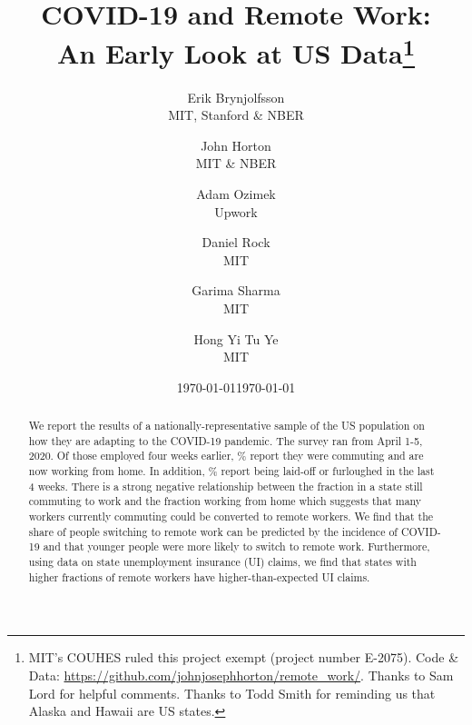 \documentclass[12pt]{article}
\newcommand{\covid}{COVID-19}
\begin{document}
 



\title{COVID-19 and Remote Work:\\ An Early Look at US Data\footnote{
    MIT's COUHES ruled this project exempt (project number E-2075).
    {Code \& Data: \href{https://github.com/johnjosephhorton/remote\_work/}{https://github.com/johnjosephhorton/remote\_work/}}.
    Thanks to Sam Lord for helpful comments.
    Thanks to Todd Smith for reminding us that Alaska and Hawaii are US states. 
  }}

\date{\today}

\date{\today}

\author{Erik Brynjolfsson\\MIT, Stanford \& NBER \and John Horton\\MIT \& NBER \and Adam Ozimek\\Upwork \and Daniel Rock\\MIT \and Garima Sharma\\MIT \and Hong Yi Tu Ye\\MIT}


\maketitle

\begin{abstract}
  \noindent 
  We report the results of a nationally-representative sample of the US population on how they are adapting to the \covid{} pandemic.
  The survey ran from April 1-5, 2020.
  Of those employed four weeks earlier, \WFH{}\% report they were commuting and are now working from home.
  In addition, \LaidOff{}\% report being laid-off or furloughed in the last 4 weeks.   
  There is a strong negative relationship between the fraction in a state still commuting to work and the fraction working from home which suggests that many workers currently commuting could be converted to remote workers.  We find that the share of people switching to remote work can be predicted  by the incidence of \covid{} and that younger people were more likely to switch to remote work.
  Furthermore, using data on state unemployment insurance (UI) claims, we find that states with higher fractions of remote workers have higher-than-expected UI claims.
  \newline 
\end{abstract} 
\end{document}

